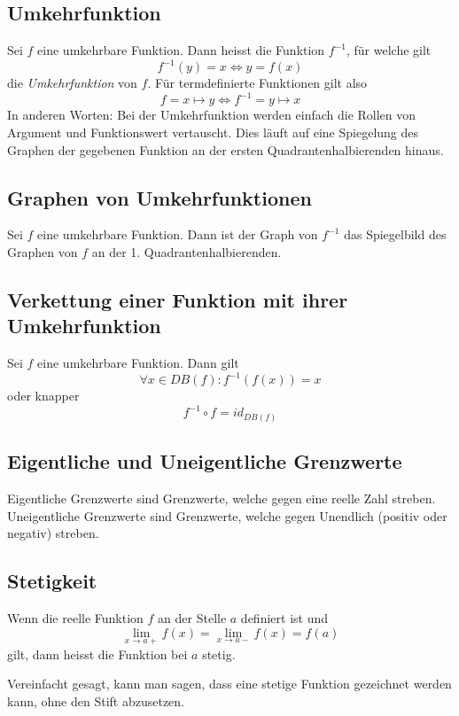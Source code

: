 \subsection{Umkehrfunktion}

Sei $f$ eine umkehrbare Funktion. Dann heisst die Funktion $f^{-1}$, für welche gilt
%
\begin{displaymath}
	f^{-1}(y) = x \Leftrightarrow y = f(x)
\end{displaymath}
%
die \textit{Umkehrfunktion} von $f$. Für termdefinierte Funktionen gilt also
%
\begin{displaymath}
	f = x \mapsto y \Leftrightarrow f^{-1} = y \mapsto x
\end{displaymath}
%
In anderen Worten: Bei der Umkehrfunktion werden einfach die Rollen von Argument und Funktionswert
vertauscht. Dies läuft auf eine Spiegelung des Graphen der gegebenen Funktion an der ersten
Quadrantenhalbierenden hinaus.


\subsection{Graphen von Umkehrfunktionen}

Sei $f$ eine umkehrbare Funktion. Dann ist der Graph von $f^{-1}$ das Spiegelbild des Graphen von
$f$ an der 1. Quadrantenhalbierenden.


\subsection{Verkettung einer Funktion mit ihrer Umkehrfunktion}

Sei $f$ eine umkehrbare Funktion. Dann gilt
%
\begin{displaymath}
	\forall x \in DB(f): f^{-1}(f(x)) = x
\end{displaymath}
%
oder knapper
%
\begin{displaymath}
	f^{-1} \circ f = id_{DB(f)}
\end{displaymath}

\subsection{Eigentliche und Uneigentliche Grenzwerte}

Eigentliche Grenzwerte sind Grenzwerte, welche gegen eine reelle Zahl streben. Uneigentliche
Grenzwerte sind Grenzwerte, welche gegen Unendlich (positiv oder negativ) streben.

\subsection{Stetigkeit}

Wenn die reelle Funktion $f$ an der Stelle $a$ definiert ist und
%
\begin{displaymath}
	\lim_{x \to a+} f(x) = \lim_{x \to a-} f(x) = f(a)
\end{displaymath}
%
gilt, dann heisst die Funktion bei $a$ stetig.

Vereinfacht gesagt, kann man sagen, dass eine stetige Funktion gezeichnet werden kann, ohne den
Stift abzusetzen.
